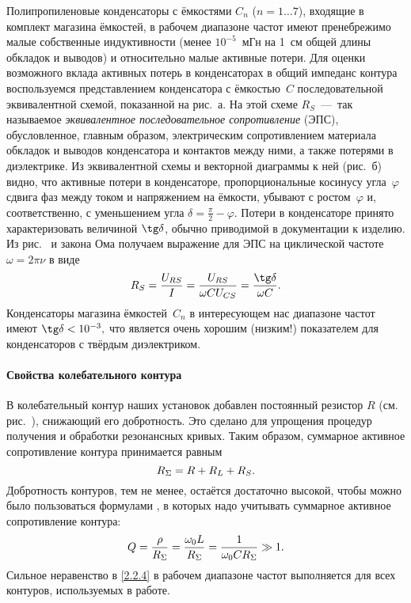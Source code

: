 Полипропиленовые конденсаторы с ёмкостями $C_n$ ($n=1\ldots7$), 
входящие в комплект магазина ёмкостей, в рабочем диапазоне частот имеют 
пренебрежимо малые собственные индуктивности (менее $10^{-5}$~мГн на 1~см общей длины обкладок и
выводов) и относительно малые активные потери. Для оценки возможного вклада
активных потерь в конденсаторах в общий импеданс контура воспользуемся
представлением конденсатора с ёмкостью~$C$ последовательной эквивалентной
схемой, показанной на рис.~а.
На этой схеме $R_S$~---~так называемое \emph{эквивалентное последовательное
сопротивление} (ЭПС), обусловленное, главным образом, электрическим
сопротивлением материала обкладок и выводов конденсатора и контактов между ними,
а также потерями в диэлектрике. Из эквивалентной схемы и векторной диаграммы к
ней (рис.~б) видно, что активные потери в конденсаторе,
пропорциональные косинусу угла~$\varphi$ сдвига фаз между током и
напряжением на ёмкости, убывают с ростом~$\varphi$ и, соответственно, с
уменьшением угла $\delta=\frac{\pi}{2}-\varphi$. Потери в конденсаторе принято
характеризовать величиной $\tg\delta$, обычно приводимой в документации к
изделию. Из рис.~ и закона Ома получаем 
выражение для ЭПС на циклической частоте $\omega=2\pi \nu$ в виде
\begin{equation}\eqmark{2.2.1}
R_S=\dfrac{U_{RS}}{I}=\dfrac{U_{RS}}{\omega CU_{CS}}=\dfrac{\tg\delta}{\omega C}.
\end{equation}
Конденсаторы магазина ёмкостей~$C_n$ в интересующем нас диапазоне частот имеют
$\tg\delta<10^{-3},$ что является очень хорошим (низким!) показателем для
конденсаторов с твёрдым диэлектриком.

\paragraph{Свойства колебательного контура}

В колебательный контур наших установок добавлен постоянный резистор $R$ (см.
рис.~), снижающий его добротность. Это сделано для упрощения
процедур получения и обработки резонансных кривых. Таким образом, суммарное
активное сопротивление контура принимается равным
\begin{equation}\eqmark{2.2.2}
	R_{\Sigma}=R+R_L+R_S.
\end{equation}
Добротность контуров, тем не менее, остаётся достаточно высокой, чтобы можно
было пользоваться формулами , в которых
надо учитывать суммарное активное сопротивление контура:
\begin{equation}\eqmark{2.2.3}
	Q=\frac{\rho}{R_{\Sigma}}=\frac{\omega_0L}{R_{\Sigma}}=
    \frac{1}{\omega_0CR_{\Sigma}}\gg 1.
\end{equation}
Сильное неравенство в \eqref{2.2.4} в рабочем диапазоне частот выполняется для
всех контуров, используемых в работе.

